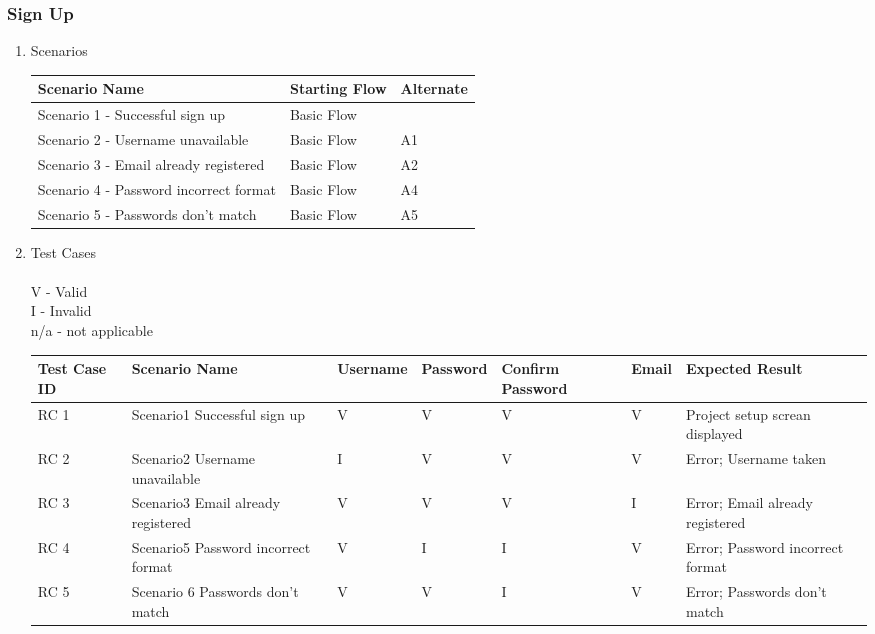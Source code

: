 \documentclass[hidelinks, 12pt, oneside]{article}
\begin{document}
\subsubsection{Sign Up}
\begin{enumerate}
\item Scenarios

\begin{center}
 \begin{tabu}to 0.8\textwidth{|X[l]| X|X|} 
 \hline
 Scenario Name & Starting Flow & Alternate \\ [1ex]
 \hline
 Scenario 1 - Successful sign up & Basic Flow &\\ [1ex]
 \hline
Scenario 2 - Username unavailable & Basic Flow & A1  \\[1ex]
 \hline
 Scenario 3 - Email already registered & Basic Flow & A2  \\[1ex]
 \hline
 Scenario 4 - Password incorrect format & Basic Flow & A4  \\ [1ex] 
 \hline
 Scenario 5 - Passwords don't match & Basic Flow & A5  \\ [1ex] 
 \hline
\end{tabu}
\end{center}

\item Test Cases\\
\\V - Valid\\ I - Invalid\\ n/a - not applicable
\begin{center}
\begin{tabu}to 1.1\textwidth{|X[l]|X|X|X|X|X|X|} 
 \hline
 Test Case ID & Scenario Name & Username & Password & Confirm Password & Email & Expected Result \\ [0.1ex]
 \hline
  RC 1 & Scenario1 Successful sign up & V & V & V & V & Project setup screan displayed\\ [0.1ex]
 \hline
 RC 2 & Scenario2 Username unavailable & I&V&V&V&Error; Username taken \\[0.1ex]
 \hline
  RC 3 & Scenario3 Email already registered & V&V&V&I&Error; Email already registered\\[0.1ex]
 \hline
 RC 4 &  Scenario5 Password incorrect format & V&I&I&V&Error; Password incorrect format\\[0.1ex]
 \hline
 RC 5 &  Scenario 6 Passwords don't match & V&V&I&V&Error; Passwords don't match  \\ [0.1ex]
 \hline
\end{tabu}
\end{center}



\end{enumerate}
\end{document}
